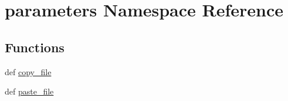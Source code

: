 \hypertarget{namespaceparameters}{\section{parameters Namespace Reference}
\label{namespaceparameters}
}
\subsection*{Functions}
\begin{DoxyCompactItemize}
\item 
def \hyperlink{namespaceparameters_a5bf39da79c5f089ba99196e263023a0a}{copy\-\_\-file}
\item 
def \hyperlink{namespaceparameters_aed226c7bf67925e5dc14d200c8066da8}{paste\-\_\-file}
\end{DoxyCompactItemize}
